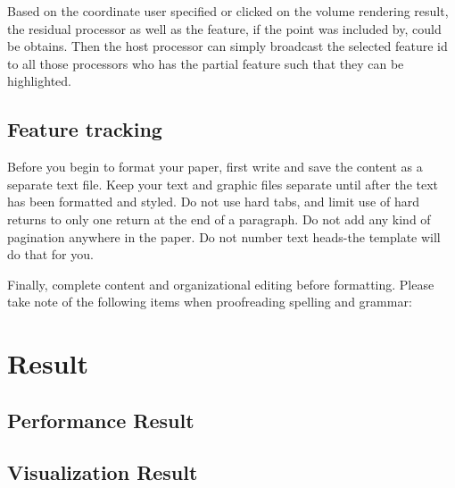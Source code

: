 \documentclass[10pt, conference, compsocconf]{IEEEtran}
\begin{document}
Based on the coordinate user specified or clicked on the volume rendering result, the residual processor as well as the feature, if the point was included by, could be obtains. Then the host processor can simply broadcast the selected feature id to all those processors who has the partial feature such that they can be highlighted.


\subsection{Feature tracking}
Before you begin to format your paper, first write and save the content as a separate text file. Keep your text and graphic files separate until after the text has been formatted and styled. Do not use hard tabs, and limit use of hard returns to only one return at the end of a paragraph. Do not add any kind of pagination anywhere in the paper. Do not number text heads-the template will do that for you.

Finally, complete content and organizational editing before formatting. Please take note of the following items when proofreading spelling and grammar:

\section{Result}
\subsection{Performance Result}
\subsection{Visualization Result}
\end{document}
